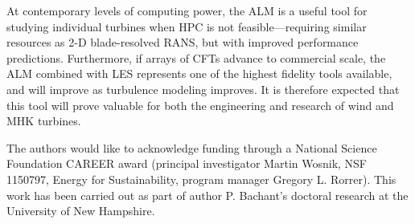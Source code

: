 \documentclass[times]{weauth}
\begin{document}
At contemporary levels of computing power, the ALM is a useful tool for studying
individual turbines when HPC is not feasible---requiring similar resources as
2-D blade-resolved RANS, but with improved performance predictions. Furthermore,
if arrays of CFTs advance to commercial scale, the ALM combined with LES
represents one of the highest fidelity tools available, and will improve as
turbulence modeling improves. It is therefore expected that this tool will prove
valuable for both the engineering and research of wind and MHK turbines.


\acks The authors would like to acknowledge funding through a National Science
Foundation CAREER award (principal investigator Martin Wosnik, NSF 1150797,
Energy for Sustainability, program manager Gregory L. Rorrer). This work has
been carried out as part of author P. Bachant's doctoral research at the
University of New Hampshire.



\end{document}
